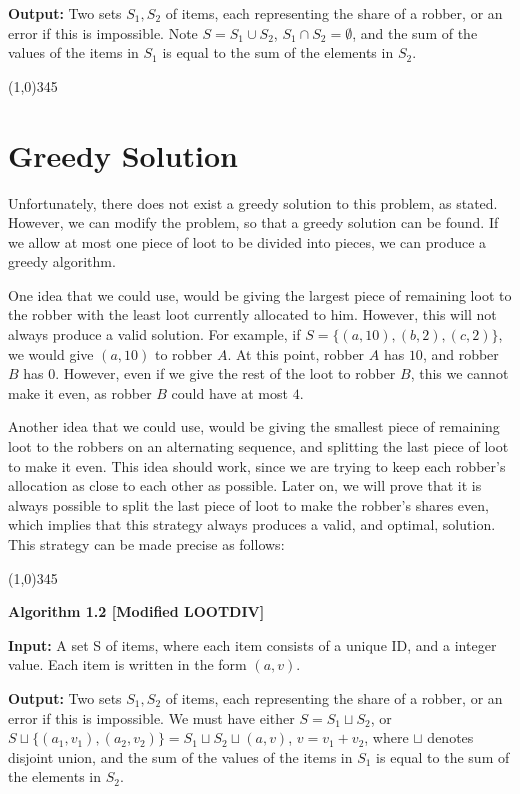 \documentclass{article}
\begin{document}
\textbf{Output:} Two sets $S_1, S_2$ of items, each representing the share of a robber, or an error if this is impossible.  Note $S = S_1 \cup S_2$, $S_1 \cap S_2 = \emptyset$, and the sum of the values of the items in $S_1$ is equal to the sum of the elements in $S_2$. 

\begin{center}
\line(1,0){345}
\end{center}

\newpage

\section{Greedy Solution}

Unfortunately, there does not exist a greedy solution to this problem, as stated.  However, we can modify the problem, so that a greedy solution can be found.  If we allow at most one piece of loot to be divided into pieces, we can produce a greedy algorithm.

One idea that we could use, would be giving the largest piece of remaining loot to the robber with the least loot currently allocated to him.  However, this will not always produce a valid solution.  For example, if $S = \{(a,10),(b,2),(c,2)\}$, we would give $(a,10)$ to robber $A$.  At this point, robber $A$ has $10$, and robber $B$ has $0$.  However, even if we give the rest of the loot to robber $B$, this we cannot make it even, as robber $B$ could have at most $4$.

Another idea that we could use, would be giving the smallest piece of remaining loot to the robbers on an alternating sequence, and splitting the last piece of loot to make it even.  This idea should work, since we are trying to keep each robber's allocation as close to each other as possible.  Later on, we will prove that it is always possible to split the last piece of loot to make the robber's shares even, which implies that this strategy always produces a valid, and optimal, solution.  This strategy can be made precise as follows:

\begin{center}
\line(1,0){345}
\end{center}
\textbf{Algorithm 1.2 [Modified LOOTDIV]}

\textbf{Input:} A set S of items, where each item consists of a unique ID, and a integer value.  Each item is written in the form $(a,v)$.

\textbf{Output:} Two sets $S_1, S_2$ of items, each representing the share of a robber, or an error if this is impossible.  We must have either $S = S_1 \sqcup S_2$, or $S \sqcup \{(a_1, v_1),(a_2,v_2)\} = S_1 \sqcup S_2 \sqcup (a,v)$, $v = v_1 + v_2$, where $\sqcup$ denotes disjoint union, and the sum of the values of the items in $S_1$ is equal to the sum of the elements in $S_2$. 
\end{document}
